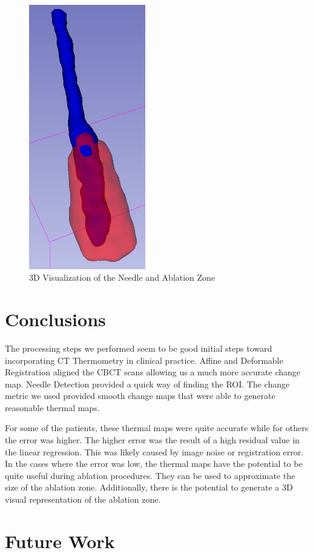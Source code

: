 \documentclass[]{spie}  %
\begin{document}
\begin{figure} 
\centering 
\includegraphics[width=2in]{NeedleAndAblationZone.png} 
\caption{3D Visualization of the Needle and Ablation Zone}
\label{needleAblationZone} 
\end{figure}

\section{Conclusions}

The processing steps we performed seem to be good initial steps toward incorporating CT Thermometry in clinical practice. Affine and Deformable Registration aligned the CBCT scans allowing us a much more accurate change map. Needle Detection provided a quick way of finding the ROI. The change metric we used provided smooth change maps that were able to generate reasonable thermal maps. 

For some of the patients, these thermal maps were quite accurate while for others the error was higher. The higher error was the result of a high residual value in the linear regression. This was likely caused by image noise or registration error. In the cases where the error was low, the thermal maps have the potential to be quite useful during ablation procedures. They can be used to approximate the size of the ablation zone. Additionally, there is the potential to generate a 3D visual representation of the ablation zone. 

\section{Future Work}
\end{document}

